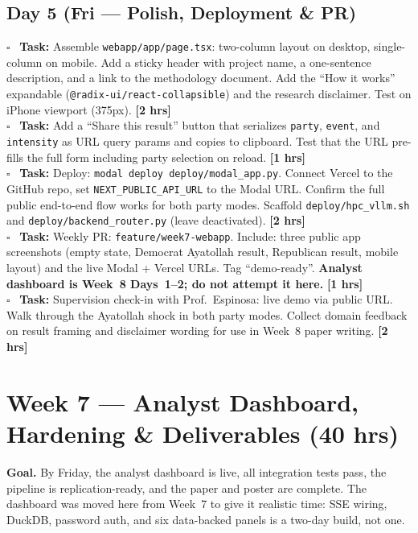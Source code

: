 \documentclass[11pt]{article}
\newcommand{\hrs}[1]{\textbf{[#1 hrs]}}
\newcommand{\dayhead}[2]{%
  \subsection*{Day #1 \normalfont\small\color{codegray}(#2)}}
\newcommand{\task}[2]{%
  \noindent\textbf{Task:} #1 \hfill \hrs{#2}\\}
\newcommand{\done}{\textcolor{sectionblue}{$\square$}\ }
\begin{document}
\dayhead{5}{Fri --- Polish, Deployment \& PR}

\begin{taskbox}
\done \task{Assemble \texttt{webapp/app/page.tsx}: two-column layout on desktop,
  single-column on mobile. Add a sticky header with project name, a
  one-sentence description, and a link to the methodology document.
  Add the ``How it works'' expandable (\texttt{@radix-ui/react-collapsible})
  and the research disclaimer. Test on iPhone viewport (375px).}{2}

\done \task{Add a ``Share this result'' button that serializes \texttt{party},
  \texttt{event}, and \texttt{intensity} as URL query params and copies to
  clipboard. Test that the URL pre-fills the full form including party
  selection on reload.}{1}

\done \task{Deploy: \texttt{modal deploy deploy/modal\_app.py}. Connect
  Vercel to the GitHub repo, set \texttt{NEXT\_PUBLIC\_API\_URL} to the
  Modal URL. Confirm the full public end-to-end flow works for both party
  modes. Scaffold \texttt{deploy/hpc\_vllm.sh} and
  \texttt{deploy/backend\_router.py} (leave deactivated).}{2}

\done \task{Weekly PR: \texttt{feature/week7-webapp}. Include: three public app
  screenshots (empty state, Democrat Ayatollah result, Republican result,
  mobile layout) and the live Modal + Vercel URLs. Tag ``demo-ready''.
  \textbf{Analyst dashboard is Week~8 Days~1--2; do not attempt it here.}}{1}

\done \task{Supervision check-in with Prof.\ Espinosa: live demo via public URL.
  Walk through the Ayatollah shock in both party modes. Collect domain feedback
  on result framing and disclaimer wording for use in Week~8 paper writing.}{2}
\end{taskbox}

\newpage

\section{Week 7 --- Analyst Dashboard, Hardening \& Deliverables (40 hrs)}

\textbf{Goal.} By Friday, the analyst dashboard is live, all integration tests
pass, the pipeline is replication-ready, and the paper and poster are complete.
The dashboard was moved here from Week~7 to give it realistic time: SSE wiring,
DuckDB, password auth, and six data-backed panels is a two-day build, not one.
\end{document}
